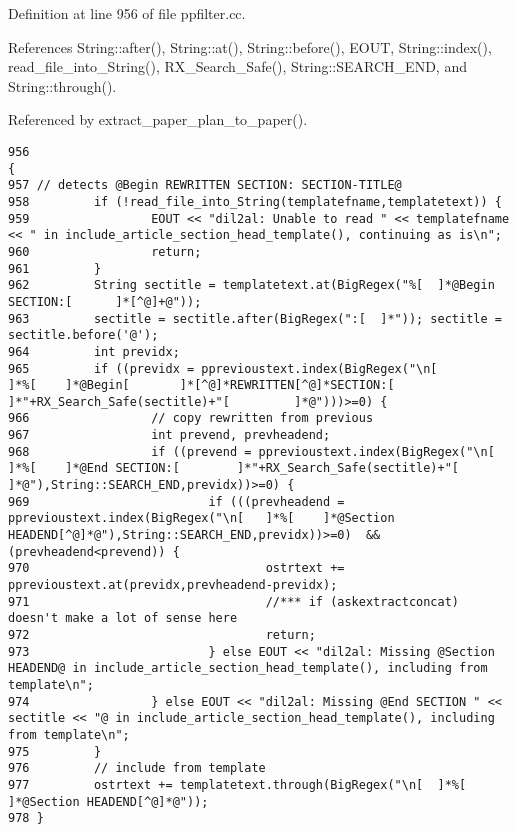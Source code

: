 Definition at line 956 of file ppfilter.cc.

References String::after(), String::at(), String::before(), EOUT, String::index(), read\_\-file\_\-into\_\-String(), RX\_\-Search\_\-Safe(), String::SEARCH\_\-END, and String::through().

Referenced by extract\_\-paper\_\-plan\_\-to\_\-paper().



\footnotesize\begin{verbatim}956                                                                                                                                      {
957 // detects @Begin REWRITTEN SECTION: SECTION-TITLE@
958         if (!read_file_into_String(templatefname,templatetext)) {
959                 EOUT << "dil2al: Unable to read " << templatefname << " in include_article_section_head_template(), continuing as is\n";
960                 return;
961         }
962         String sectitle = templatetext.at(BigRegex("%[  ]*@Begin SECTION:[      ]*[^@]+@"));
963         sectitle = sectitle.after(BigRegex(":[  ]*")); sectitle = sectitle.before('@');
964         int previdx;
965         if ((previdx = pprevioustext.index(BigRegex("\n[        ]*%[    ]*@Begin[       ]*[^@]*REWRITTEN[^@]*SECTION:[  ]*"+RX_Search_Safe(sectitle)+"[         ]*@")))>=0) {
966                 // copy rewritten from previous
967                 int prevend, prevheadend;
968                 if ((prevend = pprevioustext.index(BigRegex("\n[        ]*%[    ]*@End SECTION:[        ]*"+RX_Search_Safe(sectitle)+"[         ]*@"),String::SEARCH_END,previdx))>=0) {
969                         if (((prevheadend = pprevioustext.index(BigRegex("\n[   ]*%[    ]*@Section HEADEND[^@]*@"),String::SEARCH_END,previdx))>=0)  && (prevheadend<prevend)) {
970                                 ostrtext += pprevioustext.at(previdx,prevheadend-previdx);
971                                 //*** if (askextractconcat) doesn't make a lot of sense here
972                                 return;
973                         } else EOUT << "dil2al: Missing @Section HEADEND@ in include_article_section_head_template(), including from template\n";
974                 } else EOUT << "dil2al: Missing @End SECTION " << sectitle << "@ in include_article_section_head_template(), including from template\n";
975         }
976         // include from template
977         ostrtext += templatetext.through(BigRegex("\n[  ]*%[    ]*@Section HEADEND[^@]*@"));
978 }
\end{verbatim}\normalsize 
{}
